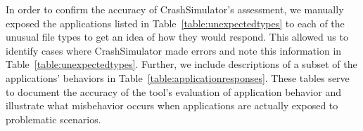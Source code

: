 \begin{table}[t]
    \scriptsize{}
    \caption{Responses of a sample of coreutils applications when exposed to
      anomalous conditions.  The character device used was the infinite-length {\tt
        /dev/urandom}.}
    \label{table:applicationresponses}
\end{table}

In order to confirm the accuracy of CrashSimulator's assessment, we manually
exposed the applications listed in Table~\ref{table:unexpectedtypes} to
each of the unusual file types to get an idea of how they would respond.
This allowed us to identify cases where CrashSimulator made errors and
note this information in Table~\ref{table:unexpectedtypes}.  Further,
we include descriptions of a subset of the applications' behaviors in
Table~\ref{table:applicationresponses}.
These tables serve to document the accuracy of the tool's
evaluation of application behavior and illustrate what misbehavior occurs
when applications are actually exposed to problematic scenarios.

